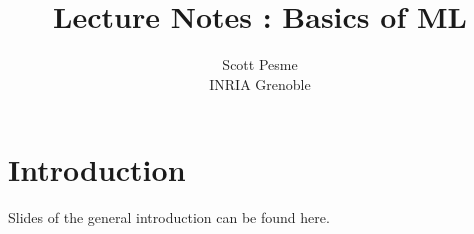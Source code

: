 \documentclass[11pt]{article}
\title{Lecture Notes : Basics of ML}
\author{Scott Pesme \\ \small INRIA Grenoble}
\begin{document}
\maketitle
\tableofcontents

\newpage

\section{Introduction}
Slides of the general introduction can be found here.

\


% 




\newpage
\appendix


\end{document}
